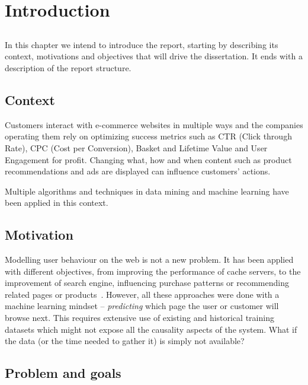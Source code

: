\chapter{Introduction} \label{chap:intro}

\section*{}

In this chapter we intend to introduce the report, starting by describing its 
context, motivations and objectives that will drive the dissertation. It ends 
with a description of the report structure.

\section{Context} \label{sec:context}

Customers interact with e-commerce websites in multiple ways and the companies
operating them rely on optimizing success metrics such as CTR (Click
through Rate), CPC (Cost per Conversion), Basket and Lifetime Value and User
Engagement for profit. Changing what, how and when content such as product
recommendations and ads are displayed can influence customers' actions.

Multiple algorithms and techniques in data mining and machine learning
have been applied in this context.

\section{Motivation} \label{sec:motiv}

Modelling user behaviour on the web is not a new problem. It has been applied 
with different objectives, from improving the performance of cache 
servers, to the improvement of search engine, influencing purchase patterns or 
recommending related pages or products~\cite{Deshpande2001, 
JSrivastavaRCooley2000}. However, all these approaches were done with a machine 
learning mindset -- \textit{predicting} which page the user or customer will 
browse next. This requires extensive use of existing and historical training 
datasets which might not expose all the causality aspects of the system. What 
if the data (or the time needed to gather it) is simply not available?

\section{Problem and goals} \label{sec:problem}

